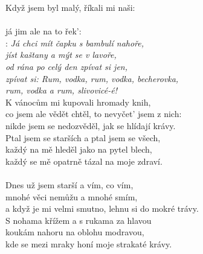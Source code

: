 
Když jsem byl malý, říkali mi naši:\\
\\
já jim ale na to řek': \\

\textregistered: \emph{Já chci mít čapku s bambulí nahoře,\\
jíst kaštany a mýt se v lavoře,\\
od rána po celý den zpívat si jen,\\
zpívat si: Rum, vodka, rum, vodka, becherovka,\\
rum, vodka a rum, slivovicé-é!}\\

K vánocům mi kupovali hromady knih,\\
co jsem ale vědět chtěl, to nevyčet' jsem z nich:\\
nikde jsem se nedozvěděl, jak se hlídají krávy.\\
Ptal jsem se starších a ptal jsem se všech,\\
každý na mě hleděl jako na pytel blech,\\
každý se mě opatrně tázal na moje zdraví.\\
\textregistered\\

Dnes už jsem starší a vím, co vím,\\
mnohé věci nemůžu a mnohé smím,\\
a když je mi velmi smutno, lehnu si do mokré trávy.\\
S nohama křížem a s rukama za hlavou\\
koukám nahoru na oblohu modravou,\\
kde se mezi mraky honí moje strakaté krávy.\\

\textregistered

\newpage
